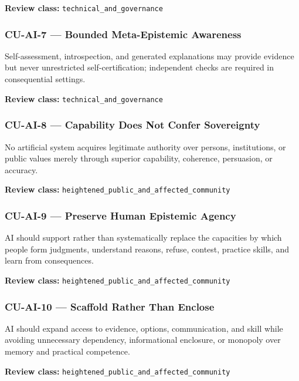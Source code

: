 \documentclass[
  11pt,
]{article}
\begin{document}
\textbf{Review class:} \texttt{technical\_and\_governance}

\subsubsection{CU-AI-7 --- Bounded Meta-Epistemic
Awareness}\label{cu-ai-7-bounded-meta-epistemic-awareness}

Self-assessment, introspection, and generated explanations may provide
evidence but never unrestricted self-certification; independent checks
are required in consequential settings.

\textbf{Review class:} \texttt{technical\_and\_governance}

\subsubsection{CU-AI-8 --- Capability Does Not Confer
Sovereignty}\label{cu-ai-8-capability-does-not-confer-sovereignty}

No artificial system acquires legitimate authority over persons,
institutions, or public values merely through superior capability,
coherence, persuasion, or accuracy.

\textbf{Review class:}
\texttt{heightened\_public\_and\_affected\_community}

\subsubsection{CU-AI-9 --- Preserve Human Epistemic
Agency}\label{cu-ai-9-preserve-human-epistemic-agency}

AI should support rather than systematically replace the capacities by
which people form judgments, understand reasons, refuse, contest,
practice skills, and learn from consequences.

\textbf{Review class:}
\texttt{heightened\_public\_and\_affected\_community}

\subsubsection{CU-AI-10 --- Scaffold Rather Than
Enclose}\label{cu-ai-10-scaffold-rather-than-enclose}

AI should expand access to evidence, options, communication, and skill
while avoiding unnecessary dependency, informational enclosure, or
monopoly over memory and practical competence.

\textbf{Review class:}
\texttt{heightened\_public\_and\_affected\_community}
\end{document}
